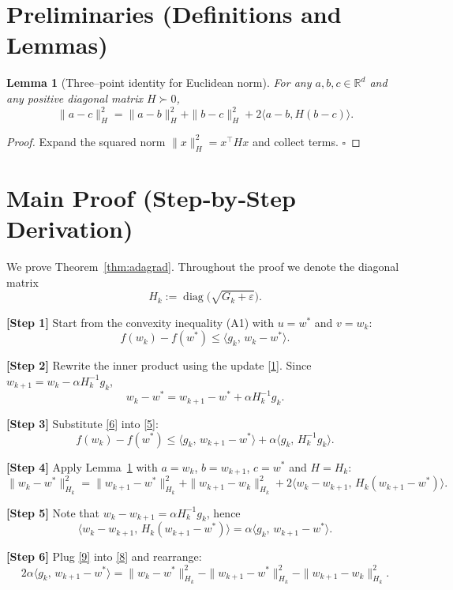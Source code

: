 \documentclass{article}
\newtheorem{lemma}{Lemma}
\newcommand{\R}{\mathbb{R}}
\begin{document}
\newpage
\section*{Preliminaries (Definitions and Lemmas)}
\begin{lemma}[Three–point identity for Euclidean norm]\label{lem:threepoint}
For any $a,b,c\in\R^{d}$ and any positive diagonal matrix $H\succ0$,
\[
\|a-c\|_{H}^{2}
   =\|a-b\|_{H}^{2}+\|b-c\|_{H}^{2}+2\langle a-b, H(b-c)\rangle .
\tag{4}
\]
\end{lemma}
\begin{proof}
Expand the squared norm $\|x\|_{H}^{2}=x^{\top}Hx$ and collect terms. \hfill $\square$
\end{proof}

\section*{Main Proof (Step‑by‑Step Derivation)}
We prove Theorem~\ref{thm:adagrad}. Throughout the proof we denote the diagonal matrix
\[
H_{k}:=\operatorname{diag}\!\bigl(\sqrt{G_{k}+\varepsilon}\bigr) .
\]

\noindent\textbf{[Step 1]}  Start from the convexity inequality (A1) with $u=w^{*}$ and $v=w_{k}$:
\[
f(w_{k})-f(w^{*})\le\langle g_{k},\,w_{k}-w^{*}\rangle .
\tag{5}
\]

\noindent\textbf{[Step 2]}  Rewrite the inner product using the update \eqref{1}. Since $w_{k+1}=w_{k}-\alpha H_{k}^{-1}g_{k}$,
\[
w_{k}-w^{*}=w_{k+1}-w^{*}+\alpha H_{k}^{-1}g_{k}.
\tag{6}
\]

\noindent\textbf{[Step 3]}  Substitute \eqref{6} into \eqref{5}:
\[
f(w_{k})-f(w^{*})
   \le\langle g_{k},\,w_{k+1}-w^{*}\rangle
      +\alpha\langle g_{k},\,H_{k}^{-1}g_{k}\rangle .
\tag{7}
\]

\noindent\textbf{[Step 4]}  Apply Lemma~\ref{lem:threepoint} with $a=w_{k}$, $b=w_{k+1}$, $c=w^{*}$ and $H=H_{k}$:
\[
\|w_{k}-w^{*}\|_{H_{k}}^{2}
   =\|w_{k+1}-w^{*}\|_{H_{k}}^{2}
     +\|w_{k+1}-w_{k}\|_{H_{k}}^{2}
     +2\langle w_{k}-w_{k+1},\,H_{k}(w_{k+1}-w^{*})\rangle .
\tag{8}
\]

\noindent\textbf{[Step 5]}  Note that $w_{k}-w_{k+1}= \alpha H_{k}^{-1}g_{k}$, hence
\[
\langle w_{k}-w_{k+1},\,H_{k}(w_{k+1}-w^{*})\rangle
   =\alpha\langle g_{k},\,w_{k+1}-w^{*}\rangle .
\tag{9}
\]

\noindent\textbf{[Step 6]}  Plug \eqref{9} into \eqref{8} and rearrange:
\[
2\alpha\langle g_{k},\,w_{k+1}-w^{*}\rangle
   =\|w_{k}-w^{*}\|_{H_{k}}^{2}
    -\|w_{k+1}-w^{*}\|_{H_{k}}^{2}
    -\|w_{k+1}-w_{k}\|_{H_{k}}^{2}.
\tag{10}
\]
\end{document}
